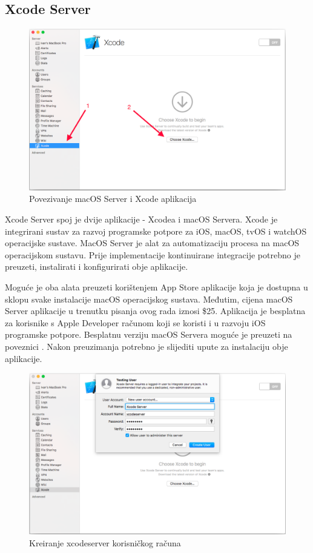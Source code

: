 \documentclass[times, utf8, diplomski, numeric]{fer}
\begin{document}
\subsection{Xcode Server}

\begin{figure}
\centering
\includegraphics[scale=0.35]{XcodeServerSetup1}
\caption{Povezivanje macOS Server i Xcode aplikacija}
\label{fig:XcodeServerSetup1}
\end{figure}

Xcode Server spoj je dvije aplikacije - Xcodea i macOS Servera. Xcode je integrirani sustav za razvoj programske potpore za iOS, macOS, tvOS i watchOS operacijske sustave. MacOS Server je alat za automatizaciju procesa na macOS operacijskom sustavu. Prije implementacije kontinuirane integracije potrebno je preuzeti, instalirati i konfigurirati obje aplikacije.

Moguće je oba alata preuzeti korištenjem App Store aplikacije koja je dostupna u sklopu svake instalacije macOS operacijskog sustava. Međutim, cijena macOS Server aplikacije u trenutku pisanja ovog rada iznosi \$25. Aplikacija je besplatna za korisnike s Apple Developer računom koji se koristi i u razvoju iOS programske potpore. Besplatnu verziju macOS Servera moguće je preuzeti na poveznici . Nakon preuzimanja potrebno je slijediti upute za instalaciju obje aplikacije.

\begin{figure}
\centering
\includegraphics[scale=0.35]{XcodeServerSetup2}
\caption{Kreiranje xcodeserver korisničkog računa}
\label{fig:XcodeServerSetup2}
\end{figure}
\end{document}
